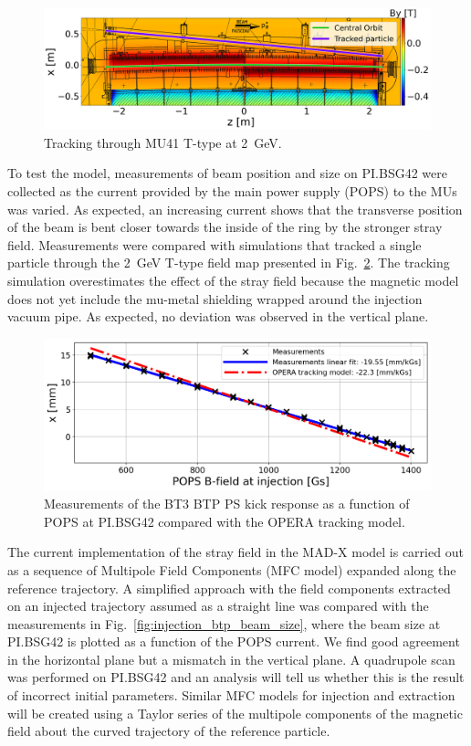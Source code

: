 \begin{figure}[!htb]
   \centering
   \includegraphics*[width=0.7\columnwidth]{01_Introduction/images/injection_tracking.png}
   \caption{Tracking through MU41 T-type at \SI{2}{GeV}.}
   \label{fig:injection_btp}
\end{figure}

To test the model, measurements of beam position and size on PI.BSG42 were collected as the current provided by the main power supply (POPS) to the MUs was varied. As expected, an increasing current shows that the transverse position of the beam is bent closer towards the inside of the ring by the stronger stray field. Measurements were compared with simulations that tracked a single particle through the \SI{2}{GeV} T-type field map presented in Fig.~\ref{fig:injection_btp_transverse_position}. The tracking simulation overestimates the effect of the stray field because the magnetic model does not yet include the mu-metal shielding wrapped around the injection vacuum pipe. As expected, no deviation was observed in the vertical plane.

\begin{figure}[!htb]
   \centering
   \includegraphics*[width=0.7\columnwidth]{01_Introduction/images/injection_measurement.png}
   \caption{Measurements of the BT3 BTP PS kick response as a function of POPS at PI.BSG42 compared with the OPERA tracking model.}
   \label{fig:injection_btp_transverse_position}
\end{figure}

The current implementation of the stray field in the \mbox{MAD-X}\cite{noauthor_mad_nodate} model is carried out as a sequence of Multipole Field Components (MFC model) expanded along the reference trajectory. A simplified approach with the field components extracted on an injected trajectory assumed as a straight line was compared with the measurements in Fig.~\ref{fig:injection_btp_beam_size}, where the beam size at PI.BSG42 is plotted as a function of the POPS current. We find good agreement in the horizontal plane but a mismatch in the vertical plane. A quadrupole scan was performed on PI.BSG42 and an analysis will tell us whether this is the result of incorrect initial parameters. Similar MFC models for injection and extraction will be created using a Taylor series of the multipole components of the magnetic field about the curved trajectory of the reference particle.

